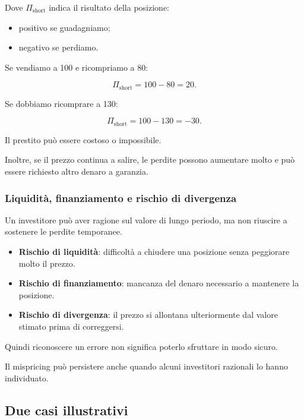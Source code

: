 \noindent Dove $\Pi_{\mathrm{short}}$
indica il risultato della posizione:

\begin{itemize}
    \item positivo se guadagniamo;
    \item negativo se perdiamo.
\end{itemize}

\medskip

\noindent Se vendiamo a 100
e ricompriamo a 80:

\[
\Pi_{\mathrm{short}}
=
100-80
=
\boxed{20}.
\]

\noindent Se dobbiamo ricomprare a 130:

\[
\Pi_{\mathrm{short}}
=
100-130
=
\boxed{-30}.
\]

\noindent Il prestito può essere
costoso o impossibile.

\noindent Inoltre, se il prezzo continua a salire,
le perdite possono aumentare molto
e può essere richiesto altro denaro a garanzia.


\subsubsection*{Liquidità, finanziamento
e rischio di divergenza}

\noindent Un investitore può aver ragione
sul valore di lungo periodo,
ma non riuscire a sostenere
le perdite temporanee.

\begin{itemize}
    \item \textbf{Rischio di liquidità}:
    difficoltà a chiudere una posizione
    senza peggiorare molto il prezzo.

    \item \textbf{Rischio di finanziamento}:
    mancanza del denaro necessario
    a mantenere la posizione.

    \item \textbf{Rischio di divergenza}:
    il prezzo si allontana ulteriormente
    dal valore stimato prima di correggersi.
\end{itemize}

\noindent Quindi riconoscere un errore
non significa poterlo sfruttare
in modo sicuro.

\noindent Il mispricing può persistere
anche quando alcuni investitori razionali
lo hanno individuato.


\subsection{Due casi illustrativi}

